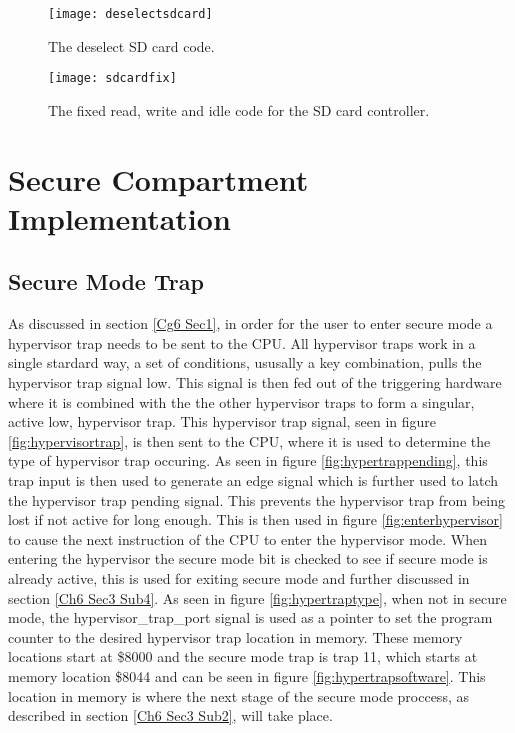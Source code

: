 \begin{figure}
  \centering
  \texttt{[image: deselectsdcard]}
  \caption{The deselect SD card code.}
  \label{fig:deselectsdcard}
\end{figure}

\begin{figure}
  \centering
  \texttt{[image: sdcardfix]}
  \caption{The fixed read, write and idle code for the SD card controller.}
  \label{fig:sdcardfix}
\end{figure}


\section{Secure Compartment Implementation}

\label{Ch6 Sec3}


\subsection{Secure Mode Trap}

\label{Ch6 Sec3 Sub1}

As discussed in section \ref{Cg6 Sec1}, in order for the user to enter secure mode a hypervisor trap needs to be sent to the CPU. All hypervisor traps work in a single stardard way, a set of conditions, ususally a key combination, pulls the hypervisor trap signal low. This signal is then fed out of the triggering hardware where it is combined with the the other hypervisor traps to form a singular, active low, hypervisor trap. This hypervisor trap signal, seen in figure \ref{fig:hypervisortrap}, is then sent to the CPU, where it is used to determine the type of hypervisor trap occuring. As seen in figure \ref{fig:hypertrappending}, this trap input is then used to generate an edge signal which is further used to latch the hypervisor trap pending signal. This prevents the hypervisor trap from being lost if not active for long enough. This is then used in figure \ref{fig:enterhypervisor} to cause the next instruction of the CPU to enter the hypervisor mode. When entering the hypervisor the secure mode bit is checked to see if secure mode is already active, this is used for exiting secure mode and further discussed in section \ref{Ch6 Sec3 Sub4}. As seen in figure \ref{fig:hypertraptype}, when not in secure mode, the hypervisor\_trap\_port signal is used as a pointer to set the program counter to the desired hypervisor trap location in memory. These memory locations start at \$8000 and the secure mode trap is trap 11, which starts at memory location \$8044 and can be seen in figure \ref{fig:hypertrapsoftware}. This location in memory is where the next stage of the secure mode proccess, as described in section \ref{Ch6 Sec3 Sub2}, will take place.

